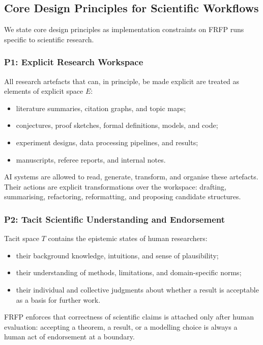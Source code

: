 \subsection{Core Design Principles for Scientific Workflows}

We state core design principles as implementation constraints on FRFP runs
specific to scientific research.

\subsubsection*{P1: Explicit Research Workspace}

All research artefacts that can, in principle, be made explicit are treated as
elements of explicit space $E$:

\begin{itemize}
  \item literature summaries, citation graphs, and topic maps;
  \item conjectures, proof sketches, formal definitions, models, and code;
  \item experiment designs, data processing pipelines, and results;
  \item manuscripts, referee reports, and internal notes.
\end{itemize}

AI systems are allowed to read, generate, transform, and organise these
artefacts.
Their actions are explicit transformations over the workspace: drafting, summarising, refactoring,
reformatting, and proposing candidate structures.

\subsubsection*{P2: Tacit Scientific Understanding and Endorsement}

Tacit space $T$ contains the epistemic states of human researchers:

\begin{itemize}
  \item their background knowledge, intuitions, and sense of plausibility;
  \item their understanding of methods, limitations, and domain-specific norms;
  \item their individual and collective judgments about whether a result
        is acceptable as a basis for further work.
\end{itemize}

FRFP enforces that correctness of scientific claims is attached only after
human evaluation:
accepting a theorem, a result, or a modelling choice is always a human act of
endorsement at a boundary.

